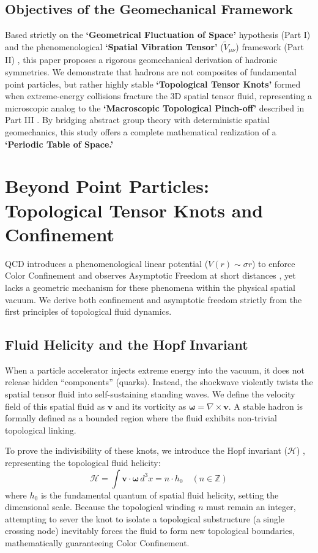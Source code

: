 \documentclass[reprint,amsmath,amssymb,aps,prd]{revtex4-2}
\begin{document}
\subsection{Objectives of the Geomechanical Framework}
Based strictly on the \textbf{`Geometrical Fluctuation of Space'} hypothesis (Part I) \cite{YooPart1} and the phenomenological \textbf{`Spatial Vibration Tensor'} ($\tilde{V}_{\mu\nu}$) framework (Part II) \cite{YooPart2}, this paper proposes a rigorous geomechanical derivation of hadronic symmetries. We demonstrate that hadrons are not composites of fundamental point particles, but rather highly stable \textbf{`Topological Tensor Knots'} formed when extreme-energy collisions fracture the 3D spatial tensor fluid, representing a microscopic analog to the \textbf{`Macroscopic Topological Pinch-off'} described in Part III \cite{YooPart3}. By bridging abstract group theory with deterministic spatial geomechanics, this study offers a complete mathematical realization of a \textbf{`Periodic Table of Space.'}

\section{Beyond Point Particles: Topological Tensor Knots and Confinement}

QCD introduces a phenomenological linear potential ($V(r) \sim \sigma r$) to enforce Color Confinement and observes Asymptotic Freedom at short distances \cite{Gross1973}, yet lacks a geometric mechanism for these phenomena within the physical spatial vacuum. We derive both confinement and asymptotic freedom strictly from the first principles of topological fluid dynamics.

\subsection{Fluid Helicity and the Hopf Invariant}
When a particle accelerator injects extreme energy into the vacuum, it does not release hidden ``components'' (quarks). Instead, the shockwave violently twists the spatial tensor fluid into self-sustaining standing waves. We define the velocity field of this spatial fluid as $\mathbf{v}$ and its vorticity as $\boldsymbol{\omega} = \nabla \times \mathbf{v}$. A stable hadron is formally defined as a bounded region where the fluid exhibits non-trivial topological linking.

To prove the indivisibility of these knots, we introduce the Hopf invariant ($\mathcal{H}$) \cite{Moffatt1969}, representing the topological fluid helicity:
\begin{equation}
\mathcal{H} = \int \mathbf{v} \cdot \boldsymbol{\omega} \, d^3x = n \cdot h_0 \quad (n \in \mathbb{Z})
\end{equation}
where $h_0$ is the fundamental quantum of spatial fluid helicity, setting the dimensional scale. Because the topological winding $n$ must remain an integer, attempting to sever the knot to isolate a topological substructure (a single crossing node) inevitably forces the fluid to form new topological boundaries, mathematically guaranteeing Color Confinement.
\end{document}
